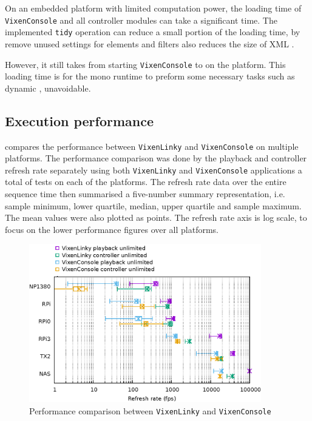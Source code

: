 On an embedded platform with limited computation power, the loading time of \texttt{VixenConsole} and all controller modules can take a significant time. The implemented \texttt{tidy} operation can reduce a small portion of the loading time, by remove unused settings for elements and filters also reduces the size of XML .

However, it still takes  from starting \texttt{VixenConsole} to  on the  platform. This loading time is for the mono runtime to preform some necessary tasks such as dynamic ,  unavoidable.

\subsection{Execution performance}

 compares the performance between \texttt{VixenLinky} and \texttt{VixenConsole} on multiple platforms. The performance comparison was done by  the playback and controller refresh rate separately using both \texttt{VixenLinky} and \texttt{VixenConsole} applications\ca{;} a total of  tests on each of the platforms. The refresh rate data over the entire sequence time  then summarised  a five-number summary representation, i.e. sample minimum, lower quartile, median, upper quartile and sample maximum. The mean values were also plotted as points. The refresh rate axis is log scale, to focus on the lower performance figures over all platforms.

\begin{figure}[t]
  \centering
  \includegraphics[width=0.9\textwidth]{Figs/raw-seq-p-c.eps}
  \caption{\footnotesize Performance comparison between \texttt{VixenLinky} and \texttt{VixenConsole}}
  \label{fig:raw-seq-p-c}
\end{figure}

